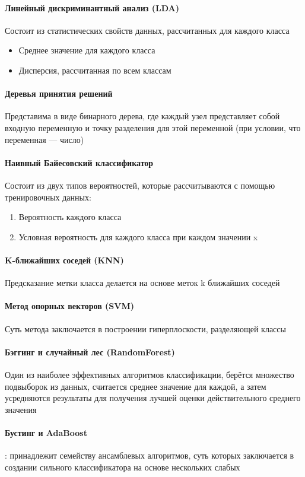 \documentclass[times,specification,annotation]{itmo-student-thesis}
\begin{document}
	\paragraph{Линейный дискриминантный анализ (LDA)} Состоит из статистических свойств данных, рассчитанных для каждого класса
	\begin{itemize}
		\item Среднее значение для каждого класса
		\item Дисперсия, рассчитанная по всем классам
	\end{itemize}
	\paragraph{Деревья принятия решений} Представима в виде бинарного дерева, где каждый узел представляет собой входную переменную и точку разделения для этой переменной (при условии, что переменная — число)
	\paragraph{Наивный Байесовский классификатор} Состоит из двух типов вероятностей, которые рассчитываются с помощью тренировочных данных:
	\begin{enumerate} 
		\item Вероятность каждого класса
		\item Условная вероятность для каждого класса при каждом значении x
	\end{enumerate}
	\paragraph{K-ближайших соседей (KNN)} Предсказание метки класса делается на основе меток k ближайших соседей
	\paragraph{Метод опорных векторов (SVM)} Суть метода заключается в построении гиперплоскости, разделяющей классы
	\paragraph{Бэггинг и случайный лес (RandomForest)} Один из наиболее эффективных алгоритмов классификации, берётся множество подвыборок из данных, считается среднее значение для каждой, а затем усредняются результаты для получения лучшей оценки действительного среднего значения
	\paragraph{Бустинг и AdaBoost}: принадлежит семейству ансамблевых алгоритмов, суть которых заключается в создании сильного классификатора на основе нескольких слабых
\end{document}
